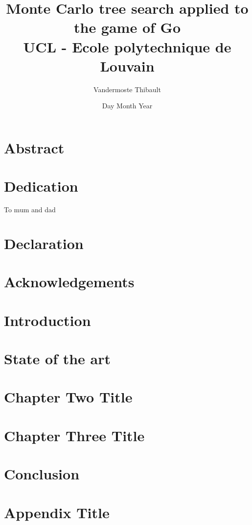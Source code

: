 \documentclass[12pt]{report}
\title{
	{Monte Carlo tree search applied to the game of Go}\\
	{\large UCL - Ecole polytechnique de Louvain}\\
}
\author{Vandermoste Thibault}
\date{Day Month Year}
\begin{document}
\maketitle


\chapter*{Abstract}

\chapter*{Dedication}

To mum and dad

\chapter*{Declaration}

\chapter*{Acknowledgements}

\tableofcontents

\chapter{Introduction}


\chapter{State of the art}


\chapter{Chapter Two Title}
%

\chapter{Chapter Three Title}
%


\chapter{Conclusion}
%

\appendix
\chapter{Appendix Title}
%
\end{document}
